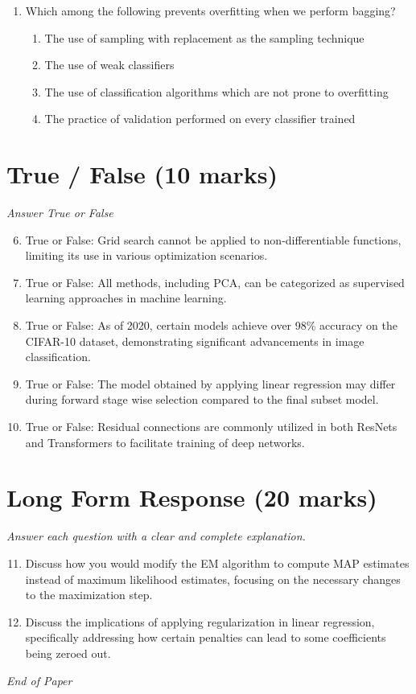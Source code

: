 \documentclass[12pt]{article}
\begin{document}
\begin{enumerate}[label=\arabic*.]
\begin{enumerate}[label=(\alph*)]
    \item Same variance
    \item None of the above
\end{enumerate}
\item Which among the following prevents overfitting when we perform bagging?
\begin{enumerate}[label=(\alph*)]
    \item The use of sampling with replacement as the sampling technique
    \item The use of weak classifiers
    \item The use of classification algorithms which are not prone to overfitting
    \item The practice of validation performed on every classifier trained
\end{enumerate}
\end{enumerate}

\section*{True / False (10 marks)}
\textit{Answer True or False}
\begin{enumerate}[label=\arabic*.]
\setcounter{enumi}{5}
\item True or False: Grid search cannot be applied to non-differentiable functions, limiting its use in various optimization scenarios.
\item True or False: All methods, including PCA, can be categorized as supervised learning approaches in machine learning.
\item True or False: As of 2020, certain models achieve over 98\% accuracy on the CIFAR-10 dataset, demonstrating significant advancements in image classification.
\item True or False: The model obtained by applying linear regression may differ during forward stage wise selection compared to the final subset model.
\item True or False: Residual connections are commonly utilized in both ResNets and Transformers to facilitate training of deep networks.
\end{enumerate}

\section*{Long Form Response (20 marks)}
\textit{Answer each question with a clear and complete explanation.}
\begin{enumerate}[label=\arabic*.]
\setcounter{enumi}{10}
\item Discuss how you would modify the EM algorithm to compute MAP estimates instead of maximum likelihood estimates, focusing on the necessary changes to the maximization step.
\item Discuss the implications of applying regularization in linear regression, specifically addressing how certain penalties can lead to some coefficients being zeroed out.
\end{enumerate}

\vfill
\noindent\textit{End of Paper}
\end{document}
